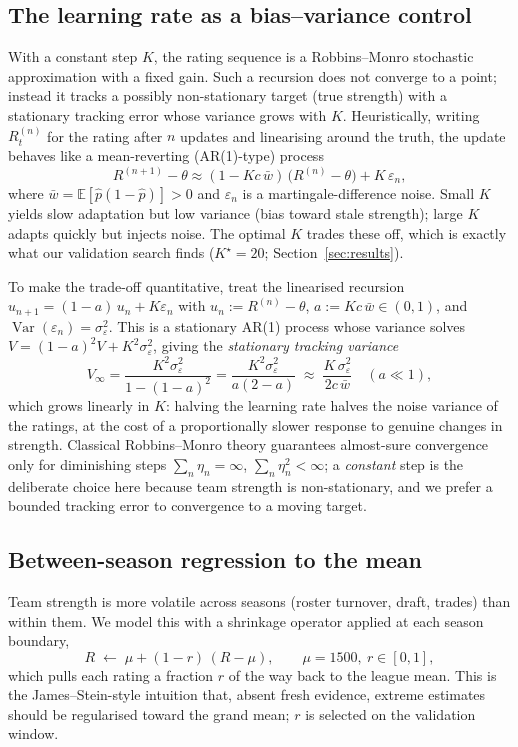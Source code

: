 \documentclass[11pt]{article}
\begin{document}
\subsection{The learning rate as a bias--variance control}
With a constant step $K$, the rating sequence is a Robbins--Monro stochastic
approximation with a fixed gain. Such a recursion does not converge to a point;
instead it tracks a possibly non-stationary target (true strength) with a
stationary tracking error whose variance grows with $K$. Heuristically, writing
$R_t^{(n)}$ for the rating after $n$ updates and linearising around the truth, the
update behaves like a mean-reverting (AR(1)-type) process
\[
R^{(n+1)} - \theta \approx (1 - K c\,\bar w)\,\big(R^{(n)} - \theta\big) + K\,\varepsilon_n,
\]
where $\bar w = \mathbb{E}[\hat p(1-\hat p)]>0$ and $\varepsilon_n$ is a
martingale-difference noise. Small $K$ yields slow adaptation but low variance
(bias toward stale strength); large $K$ adapts quickly but injects noise. The
optimal $K$ trades these off, which is exactly what our validation search finds
($K^\star = 20$; Section~\ref{sec:results}).

To make the trade-off quantitative, treat the linearised recursion
$u_{n+1} = (1-a)\,u_n + K\varepsilon_n$ with $u_n := R^{(n)}-\theta$,
$a := Kc\,\bar w \in (0,1)$, and $\operatorname{Var}(\varepsilon_n) =
\sigma_\varepsilon^2$. This is a stationary AR(1) process whose variance solves
$V = (1-a)^2 V + K^2\sigma_\varepsilon^2$, giving the \emph{stationary tracking
variance}
\begin{equation}
V_\infty = \frac{K^2 \sigma_\varepsilon^2}{1-(1-a)^2}
= \frac{K^2\sigma_\varepsilon^2}{a(2-a)}
\;\approx\; \frac{K\,\sigma_\varepsilon^2}{2c\,\bar w}\quad (a \ll 1),
\label{eq:trackvar}
\end{equation}
which grows linearly in $K$: halving the learning rate halves the
noise variance of the ratings, at the cost of a proportionally slower response to
genuine changes in strength. Classical Robbins--Monro theory \cite{robbins}
guarantees almost-sure convergence only for diminishing steps
$\sum_n \eta_n = \infty$, $\sum_n \eta_n^2 < \infty$; a \emph{constant} step is the
deliberate choice here because team strength is non-stationary, and we prefer a
bounded tracking error to convergence to a moving target.

\subsection{Between-season regression to the mean}
Team strength is more volatile across seasons (roster turnover, draft, trades)
than within them. We model this with a shrinkage operator applied at each season
boundary,
\begin{equation}
R \;\leftarrow\; \mu + (1-r)\,(R - \mu), \qquad \mu = 1500,\ r \in [0,1],
\label{eq:revert}
\end{equation}
which pulls each rating a fraction $r$ of the way back to the league mean. This is
the James--Stein-style intuition that, absent fresh evidence, extreme estimates
should be regularised toward the grand mean; $r$ is selected on the validation
window.
\end{document}

